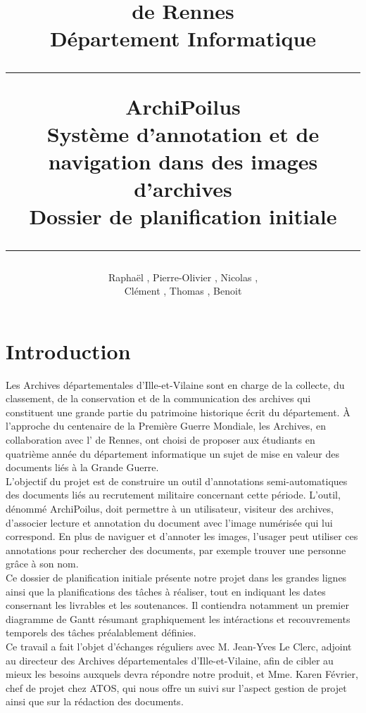 \documentclass[a4paper]{article}
\title{\bsc{INSA} de Rennes \\ Département Informatique \\ \bigskip \hrule \bigskip ArchiPoilus \\ \bigskip Système d'annotation et de navigation dans des images d'archives \\ \bigskip Dossier de planification initiale \bigskip \hrule}
\author{Raphaël \bsc{Baron}, Pierre-Olivier \bsc{Bouteau}, Nicolas \bsc{Charpentier}, \\ Clément \bsc{Leboullenger}, Thomas \bsc{François}, Benoit \bsc{Travers}}
\begin{document}
\maketitle
\thispagestyle{empty}

\newpage
\tableofcontents
\thispagestyle{empty}

\newpage
{}
{}
\section*{Introduction}

	Les Archives départementales d'Ille-et-Vilaine sont en charge de la collecte, du classement, de la conservation et de la communication des archives qui constituent une grande partie du patrimoine historique écrit du département. 
\`A l'approche du centenaire de la Première Guerre Mondiale, les Archives, en collaboration avec l' de Rennes, ont choisi de proposer aux étudiants en quatrième année du département informatique un sujet de mise en valeur des documents li\'es \`a la Grande Guerre.\\

	L'objectif du projet est de construire un outil d'annotations semi-auto\-matiques des documents liés au recrutement militaire concernant cette période. L'outil, dénommé ArchiPoilus, doit permettre à un utilisateur, visiteur des archives, d'associer lecture et annotation du document avec l'image numérisée qui lui correspond. En plus de naviguer et d'annoter les images, l'usager peut utiliser ces annotations pour rechercher des documents, par exemple trouver une personne grâce à son nom.\\
	
	Ce dossier de planification initiale présente notre projet dans les grandes lignes ainsi que la planifications des tâches à réaliser, tout en indiquant les dates consernant les livrables et les soutenances. Il contiendra notamment un premier diagramme de Gantt résumant graphiquement les intéractions et recouvrements temporels des tâches préalablement définies.\\
	
	Ce travail a fait l'objet d'échanges réguliers avec M. Jean-Yves Le Clerc, adjoint au directeur des Archives départementales d’Ille-et-Vilaine, afin de cibler au mieux les besoins auxquels devra répondre notre produit, et Mme. Karen Février, chef de projet chez ATOS, qui nous offre un suivi sur l'aspect gestion de projet ainsi que sur la rédaction des documents.
\end{document}

